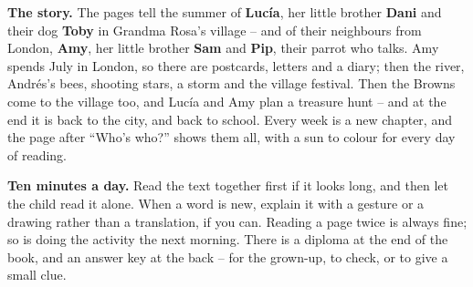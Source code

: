 \textbf{The story.} The pages tell the summer of \textbf{Lucía}, her
little brother \textbf{Dani} and their dog \textbf{Toby} in Grandma
Rosa's village -- and of their neighbours from London, \textbf{Amy},
her little brother \textbf{Sam} and \textbf{Pip}, their parrot who
talks. Amy spends July in London, so there are postcards, letters and
a diary; then the river, Andrés's bees, shooting stars, a storm and the
village festival. Then the Browns come to the village too, and Lucía
and Amy plan a treasure hunt -- and at the end it is back to the city,
and back to school.
Every week is a new chapter, and the page after ``Who's who?'' shows
them all, with a sun to colour for every day of reading.

\textbf{Ten minutes a day.} Read the text together first if it looks
long, and then let the child read it alone. When a word is new, explain
it with a gesture or a drawing rather than a translation, if you can.
Reading a page twice is always fine; so is doing the activity the next
morning. There is a diploma at the end of the book, and an answer key at
the back -- for the grown-up, to check, or to give a small clue.
\newpage
